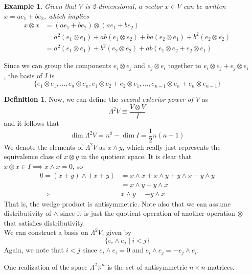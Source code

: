 \documentclass{article}
\newtheorem{example}{Example}[section]
\theoremstyle{remark}
\theoremstyle{definition}
\newtheorem{definition}{Definition}[section]
\begin{document}
\begin{example}
Given that $V$ is 2-dimensional, a vector $x \in V$ can be written $x = a e_1 + b e_2$, which implies
\begin{align*}
    x \otimes x & = (a e_1 + b e_2) \otimes (a e_1 + b e_2) \\
    & = a^2 (e_1 \otimes e_1) + a b (e_1 \otimes e_2) + b a (e_2 \otimes e_1) + b^2 (e_2 \otimes e_2) \\
    & = a^2 (e_1 \otimes e_1) + b^2 (e_2 \otimes e_2) + a b (e_1 \otimes e_2 + e_2 \otimes e_1) 
\end{align*}
\end{example}

Since we can group the components $e_i \otimes e_j$ and $e_j \otimes e_i$ together to $e_i \otimes e_j + e_j \otimes e_i$, the basis of $I$ is 
\[\{e_1 \otimes e_1, ..., e_n \otimes e_n, e_1 \otimes e_2 + e_2 \otimes e_1, ..., e_{n-1} \otimes e_n + e_n \otimes e_{n-1}\}\]

\begin{definition}
Now, we can define the \textit{second exterior power of $V$} as
\[\Lambda^2 V \equiv \frac{V \otimes V}{I}\]
and it follows that 
\[\dim{\Lambda^2 V} = n^2 - \dim{I} = \frac{1}{2} n (n-1)\]
We denote the elements of $\Lambda^2 V$ as $x \wedge y$, which really just represents the equivalence class of $x \otimes y$ in the quotient space. It is clear that $x \otimes x \in I \implies x \wedge x = 0$, so
\begin{align*}
    0 = (x + y) \wedge (x + y) & = x \wedge x + x \wedge y + y \wedge x + y \wedge y \\
    & = x \wedge y + y \wedge x \\
    \implies & x \wedge y = - y \wedge x
\end{align*}
That is, the wedge product is antisymmetric. Note also that we can assume distributivity of $\wedge$ since it is just the quotient operation of another operation $\otimes$ that satisfies distributivity. 
\\

We can construct a basis on $\Lambda^2 V$, given by 
\[\{e_i \wedge e_j \; | \; i < j\}\]
Again, we note that $i < j$ since $e_i \wedge e_i = 0$ and $e_i \wedge e_j = - e_j \wedge e_i$. 
\end{definition}

One realization of the space $\Lambda^2 \mathbb{R}^n$ is the set of antisymmetric $n \times n$ matrices. 
\\
\end{document}
